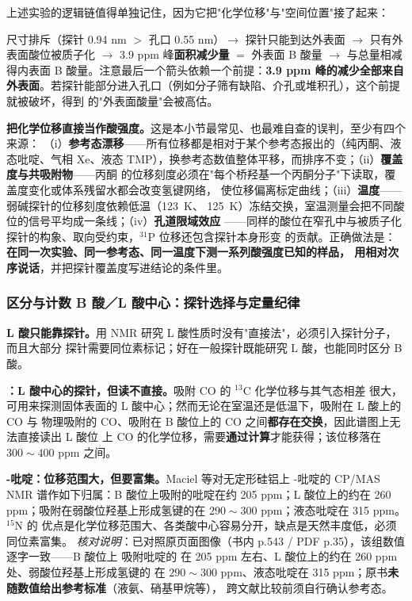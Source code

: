 \begin{dataflow}
上述实验的逻辑链值得单独记住，因为它把"化学位移"与"空间位置"接了起来：

尺寸排斥（探针 0.94 nm $>$ 孔口 0.55 nm）$\rightarrow$ 探针只能到达外表面 $\rightarrow$
只有外表面酸位被质子化 $\rightarrow$ 3.9 ppm 峰\textbf{面积减少量} $=$ 外表面 B 酸量 $\rightarrow$
与总量相减得内表面 B 酸量。注意最后一个箭头依赖一个前提：\textbf{3.9 ppm 峰的减少全部来自
外表面}。若探针能部分进入孔口（例如分子筛有缺陷、介孔或堆积孔），这个前提就被破坏，得到
的"外表面酸量"会被高估。
\end{dataflow}

\begin{pitfall}
\textbf{把化学位移直接当作酸强度。}这是本小节最常见、也最难自查的误判，至少有四个来源：
（i）\textbf{参考态漂移}——所有位移都是相对于某个参考态报出的（纯丙酮、液态吡啶、气相
Xe、液态 TMP），换参考态数值整体平移，而排序不变；（ii）\textbf{覆盖度与共吸附物}——丙酮
的位移刻度必须在"每个桥羟基一个丙酮分子"下读取，覆盖度变化或体系残留水都会改变氢键网络，
使位移偏离标定曲线；（iii）\textbf{温度}——弱碱探针的位移刻度依赖低温（\qty{123}{K}、
\qty{125}{K}）冻结交换，室温测量会把不同酸位的信号平均成一条线；（iv）\textbf{孔道限域效应}
——同样的酸位在窄孔中与被质子化探针的构象、取向受约束，$^{31}$P 位移还包含探针本身形变
的贡献。正确做法是：\textbf{在同一次实验、同一参考态、同一温度下测一系列酸强度已知的样品，
用相对次序说话}，并把探针覆盖度写进结论的条件里。
\end{pitfall}

\subsubsection{区分与计数 B 酸／L 酸中心：探针选择与定量纪律}
\label{sec:bl-quant}

\textbf{L 酸只能靠探针。}用 NMR 研究 L 酸性质时没有"直接法"，必须引入探针分子，而且大部分
探针需要同位素标记；好在一般探针既能研究 L 酸，也能同时区分 B 酸。

\textbf{：L 酸中心的探针，但读不直接。}吸附 CO 的 $^{13}$C 化学位移与其气态相差
很大，可用来探测固体表面的 L 酸中心；然而无论在室温还是低温下，吸附在 L 酸上的 CO 与
物理吸附的 CO、吸附在 B 酸位上的 CO 之间\textbf{都存在交换}，因此谱图上无法直接读出 L 酸位
上 CO 的化学位移，需要\textbf{通过计算}才能获得；该位移落在 $300\sim400$ ppm 之间。

\textbf{-吡啶：位移范围大，但要富集。}Maciel 等对无定形硅铝上 -吡啶的
 CP/MAS NMR 谱作如下归属：B 酸位上吸附的吡啶在约 205 ppm；L 酸位上的约在
260 ppm；吸附在弱酸位羟基上形成氢键的在 $290\sim300$ ppm；液态吡啶在 315 ppm。$^{15}$N 的
优点是化学位移范围大、各类酸中心容易分开，缺点是天然丰度低，必须同位素富集。
\emph{核对说明}：已对照原页面图像（书内 p.543 / PDF p.35），该组数值逐字一致——B 酸位上
吸附吡啶的  在 205 ppm 左右、L 酸位上的约在 260 ppm 处、弱酸位羟基上形成氢键的
在 $290\sim300$ ppm、液态吡啶在 315 ppm；原书\textbf{未随数值给出参考标准}（液氨、硝基甲烷等），
跨文献比较前须自行确认参考态。


